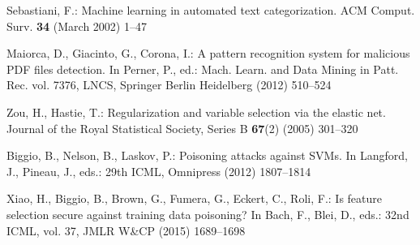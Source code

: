 \documentclass[runningheads,a4paper]{llncs}
\begin{document}
\begin{thebibliography}{10}
Sebastiani, F.:
\newblock Machine learning in automated text categorization.
\newblock ACM Comput. Surv. \textbf{34} (March 2002)  1--47

Maiorca, D., Giacinto, G., Corona, I.:
\newblock A pattern recognition system for malicious PDF files detection.
\newblock In Perner, P., ed.: Mach. Learn. and Data Mining in Patt. Rec.
vol. 7376, LNCS, Springer Berlin Heidelberg (2012)  510--524

Zou, H., Hastie, T.:
\newblock Regularization and variable selection via the elastic net.
\newblock Journal of the Royal Statistical Society, Series B \textbf{67}(2)
  (2005)  301--320
  
Biggio, B., Nelson, B., Laskov, P.:
\newblock Poisoning attacks against SVMs.
\newblock In Langford, J., Pineau, J., eds.: 29th ICML, Omnipress (2012)  1807--1814

Xiao, H., Biggio, B., Brown, G., Fumera, G., Eckert, C., Roli, F.:
\newblock Is feature selection secure against training data poisoning?
\newblock In Bach, F., Blei, D., eds.: 32nd ICML, vol. 37, JMLR W\&CP (2015) 1689--1698

\end{thebibliography}

\end{document}
